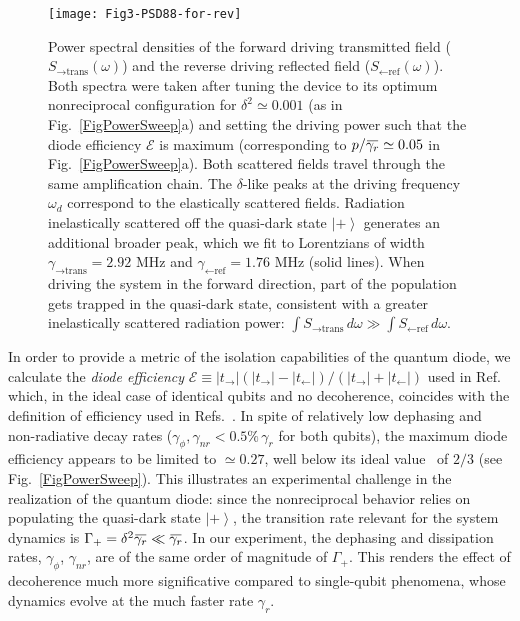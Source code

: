 \documentclass[pra, twocolumn, amsmath, amssymb, notitlepage, longbibliography, showpacs, superscriptaddress]{revtex4-1}
\newcommand{\ket}[1]{\ensuremath{\left|#1\r\rangle}}
\renewcommand{\r}[0]{\right}
\newcommand{\overbar}[1]{\mkern 1.5mu\overline{\mkern-1.5mu#1\mkern-1.5mu}\mkern 1.5mu}
\begin{document}
\begin{figure}[t]
	\centering
	\texttt{[image: Fig3-PSD88-for-rev]}
	\caption{Power spectral densities of the forward driving transmitted 
		field ($S_{\rightarrow \textrm{trans}}(\omega)$) and the reverse driving reflected 
		field ($S_{\leftarrow \textrm{ref}}(\omega)$). Both spectra were taken 
		after tuning the device to its optimum nonreciprocal configuration for
		$\delta^2 \simeq 0.001$ (as in Fig.~\ref{FigPowerSweep}a) and setting the driving power
		such that the diode efficiency $\mathcal{E}$ is maximum
		(corresponding to $p/\overbar{\gamma_r}\simeq 0.05 $ in Fig.~\ref{FigPowerSweep}a).  
		Both scattered fields travel through the same amplification chain.
		The $\delta$-like peaks at the driving frequency $\omega_d$
		correspond to the elastically scattered fields. 
		Radiation inelastically scattered off the quasi-dark state $\ket{+}$
		generates an additional broader peak, which we fit to Lorentzians
		of width $\gamma_{\rightarrow \textrm{trans}} = 2.92\textrm{ MHz}$ and 
		$\gamma_{\leftarrow \textrm{ref}} = 1.76\textrm{ MHz}$ (solid lines).
		When driving the system in the forward direction, part of the population
		gets trapped in the quasi-dark state, consistent with a greater
		inelastically scattered radiation power: 
		$ \int\!S_{\rightarrow \textrm{trans}} \, d\omega \gg \int\!S_{\leftarrow \textrm{ref}} \, d\omega$. } 
	\label{FigPSD88}
\end{figure}


In order to provide a metric of the isolation capabilities of the quantum diode, 
we calculate the \emph{diode efficiency} 
$\mathcal{E}\equiv|t_\rightarrow|(|t_\rightarrow|-|t_\leftarrow|)/(|t_\rightarrow|+|t_\leftarrow|)$ 
used in Ref.~\cite{Dai2015} which, in the ideal case of identical 
qubits and no decoherence, coincides with the definition of efficiency 
used in Refs.~\cite{Fratini2014,Dai2015, Fratini2016}. %
In spite of relatively low dephasing and non-radiative decay rates 
($\gamma_{\phi}, \gamma_{nr} < 0.5\%\, \gamma_{r}$ for both qubits), the maximum diode efficiency appears 
to be limited to $\simeq 0.27$, well below its ideal value~\cite{Muller2017a} of $2/3$
(see Fig.~\ref{FigPowerSweep}).
This illustrates an experimental challenge in the realization of the quantum diode:
since the nonreciprocal behavior relies on populating
the quasi-dark state $\ket{+}$, the transition rate
relevant for the system dynamics is
$\Gamma_+=\delta^2\overbar{\gamma_r}\ll\overbar{\gamma_r}$.
In our experiment, the dephasing and dissipation 
rates, $\gamma_\phi$, $\gamma_{nr}$, are of the same order of magnitude of $\Gamma_+$. This renders the effect of decoherence much more 
significative compared to single-qubit phenomena,
whose dynamics evolve at the much faster rate $\gamma_r$.
\end{document}
